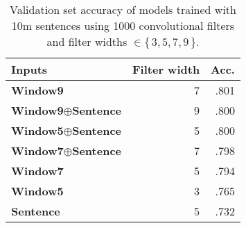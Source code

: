 \begin{table}
\centering
\begin{tabular}{lrr}
\toprule
Inputs & Filter width & Acc. \\
\midrule
\textbf{Window9} & 7 &  .801 \\
\textbf{Window9}$\oplus$\textbf{Sentence} & 9 &  .800 \\
\textbf{Window5}$\oplus$\textbf{Sentence} & 5 &  .800 \\
\textbf{Window7}$\oplus$\textbf{Sentence} & 7 &  .798  \\
\textbf{Window7} & 5 &  .794 \\
\textbf{Window5} & 3 &  .765 \\
\textbf{Sentence} & 5 &  .732 \\
\bottomrule
\end{tabular}
\caption{Validation set accuracy of models trained with 10m sentences using 1000 convolutional filters and filter widths $\in \{\, 3,5,7,9 \,\}$.}
\label{tab:HyperParameterSelection10m}
\end{table}

